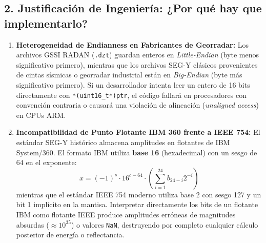 \documentclass[11pt,a4paper]{article}
\begin{document}
\subsection{2. Justificación de Ingeniería: ¿Por qué hay que implementarlo?}
\begin{enumerate}
    \item \textbf{Heterogeneidad de Endianness en Fabricantes de Georradar:}
    Los archivos GSSI RADAN (\texttt{.dzt}) guardan enteros en \textit{Little-Endian} (byte menos significativo primero), mientras que los archivos SEG-Y clásicos provenientes de cintas sísmicas o georradar industrial están en \textit{Big-Endian} (byte más significativo primero). Si un desarrollador intenta leer un entero de 16 bits directamente con \texttt{*(uint16\_t*)ptr}, el código fallará en procesadores con convención contraria o causará una violación de alineación (\textit{unaligned access}) en CPUs ARM.
    \item \textbf{Incompatibilidad de Punto Flotante IBM 360 frente a IEEE 754:}
    El estándar SEG-Y histórico almacena amplitudes en flotantes de IBM System/360. El formato IBM utiliza \textbf{base 16} (hexadecimal) con un sesgo de 64 en el exponente:
    \begin{equation}
        x = (-1)^s \cdot 16^{c - 64} \cdot \left(\sum_{i=1}^{24} b_{24-i} 2^{-i}\right)
    \end{equation}
    mientras que el estándar IEEE 754 moderno utiliza base 2 con sesgo 127 y un bit 1 implícito en la mantisa. Interpretar directamente los bits de un flotante IBM como flotante IEEE produce amplitudes erróneas de magnitudes absurdas ($\approx 10^{35}$) o valores \texttt{NaN}, destruyendo por completo cualquier cálculo posterior de energía o reflectancia.
\end{enumerate}
\end{document}
